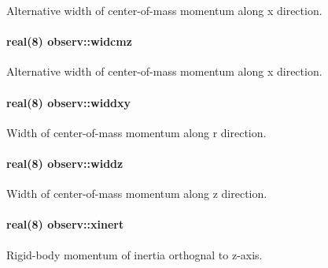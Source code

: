 Alternative width of center-\/of-\/mass momentum along x direction. 

\paragraph[{\texorpdfstring{widcmz}{widcmz}}]{\setlength{\rightskip}{0pt plus 5cm}real(8) observ\+::widcmz}\hypertarget{namespaceobserv_a128f96e19967460b67ef885021d9fb0a}{}\label{namespaceobserv_a128f96e19967460b67ef885021d9fb0a}


Alternative width of center-\/of-\/mass momentum along x direction. 

\paragraph[{\texorpdfstring{widdxy}{widdxy}}]{\setlength{\rightskip}{0pt plus 5cm}real(8) observ\+::widdxy}\hypertarget{namespaceobserv_aa975d7d153f748785eb30f5494f2ad80}{}\label{namespaceobserv_aa975d7d153f748785eb30f5494f2ad80}


Width of center-\/of-\/mass momentum along r direction. 

\paragraph[{\texorpdfstring{widdz}{widdz}}]{\setlength{\rightskip}{0pt plus 5cm}real(8) observ\+::widdz}\hypertarget{namespaceobserv_af8caa2b5090bb5b80d0299822bb858e0}{}\label{namespaceobserv_af8caa2b5090bb5b80d0299822bb858e0}


Width of center-\/of-\/mass momentum along z direction. 

\paragraph[{\texorpdfstring{xinert}{xinert}}]{\setlength{\rightskip}{0pt plus 5cm}real(8) observ\+::xinert}\hypertarget{namespaceobserv_a6687188e31bb4225d4f5f5406f282302}{}\label{namespaceobserv_a6687188e31bb4225d4f5f5406f282302}


Rigid-\/body momentum of inertia orthognal to z-\/axis. 

